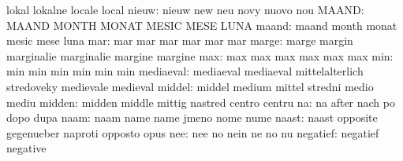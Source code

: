                            lokal                     lokalne
                           locale                    local
                    nieuw: nieuw                     new
                           neu                       novy
                           nuovo                     nou
                    MAAND: MAAND                     MONTH
                           MONAT                     MESIC
                           MESE                      LUNA
                    maand: maand                     month
                           monat                     mesic
                           mese                      luna
                      mar: mar                       mar
                           mar                       mar
                           mar                       mar
                    marge: marge                     margin
                           marginalie                marginalie
                           margine                   margine
                      max: max                       max
                           max                       max
                           max                       max
                      min: min                       min
                           min                       min
                           min                       min
                mediaeval: mediaeval                 mediaeval
                           mittelalterlich           stredoveky
                           medievale                 medieval
                   middel: middel                    medium
                           mittel                    stredni
                           medio                     mediu
                   midden: midden                    middle
                           mittig                    nastred
                           centro                    centru
                       na: na                        after
                           nach                      po
                           dopo                      dupa
                     naam: naam                      name
                           name                      jmeno
                           nome                      nume
                    naast: naast                     opposite
                           gegenueber                naproti
                           opposto                   opus
                      nee: nee                       no
                           nein                      ne
                           no                        nu
                 negatief: negatief                  negative

